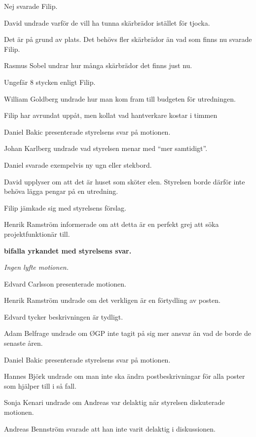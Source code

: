 \documentclass[10pt]{article}
\begin{document}
\begin{paragrafer}
\begin{paragrafer}
		Nej svarade Filip. 

		David undrade varför de vill ha tunna skärbrädor istället för tjocka.

		Det är på grund av plats. Det behövs fler skärbrädor än vad som finns nu svarade Filip.

		Rasmus Sobel undrar hur många skärbrädor det finns just nu.

		Ungefär 8 stycken enligt Filip.

		William Goldberg undrade hur man kom fram till budgeten för utredningen.

		Filip har avrundat uppåt, men kollat vad hantverkare kostar i timmen
		
		Daniel Bakic presenterade styrelsens svar på motionen.

		Johan Karlberg undrade vad styrelsen menar med ``mer samtidigt''.

		Daniel svarade exempelvis ny ugn eller stekbord.

		David upplyser om att det är huset som sköter elen. Styrelsen borde därför inte behöva lägga pengar på en utredning. 

		Filip jämkade sig med styrelsens förslag.

		Henrik Ramström informerade om att detta är en perfekt grej att söka projektfunktionär till.

		\textbf{\Mba bifalla yrkandet med styrelsens svar.}


		\emph{Ingen lyfte motionen.}

		\newpage


		Edvard Carlsson presenterade motionen.

		Henrik Ramström undrade om det verkligen är en förtydling av posten.

		Edvard tycker beskrivningen är tydligt. 

		Adam Belfrage undrade om ØGP inte tagit på sig mer ansvar än vad de borde de senaste åren. 

		Daniel Bakic presenterade styrelsens svar på motionen.

		Hannes Björk undrade om man inte ska ändra postbeskrivningar för alla poster som hjälper till i så fall.

		Sonja Kenari undrade om Andreas var delaktig när styrelsen diskuterade motionen.

		Andreas Bennström svarade att han inte varit delaktig i diskussionen.
		 

\end{paragrafer}
\end{paragrafer}
\end{document}
